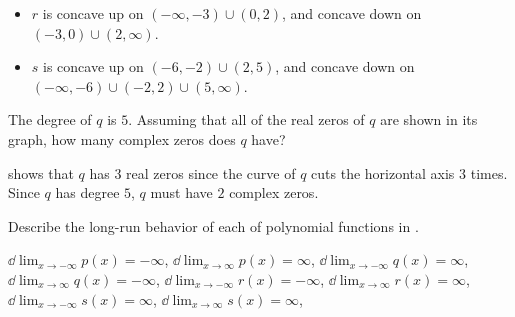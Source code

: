 \begin{exercises}
\begin{problem}
\begin{subproblem}
\begin{shortsolution}
\begin{itemize}
 				\item $r$ is concave up on $(-\infty,-3)\cup (0,2)$, and concave down on $(-3,0)\cup (2,\infty)$.
 				\item $s$ is concave up on $(-6,-2)\cup (2,5)$, and concave down on $(-\infty,-6)\cup (-2,2)\cup (5,\infty)$.
 			\end{itemize}
 		\end{shortsolution}
 	\end{subproblem}
 	\begin{subproblem}
 		The degree of $q$ is $5$. Assuming that all of the real zeros of $q$ are
 		shown in its graph, how many complex zeros does $q$ have?
 		\begin{shortsolution}
 			 shows that $q$ has $3$ real zeros
 			since the curve of $q$ cuts the horizontal axis $3$ times.
 			Since $q$ has degree $5$, $q$ must have $2$ complex zeros.
 		\end{shortsolution}
 	\end{subproblem}
 	\end{problem}

 	\begin{problem}
 	Describe the long-run behavior of each of polynomial functions in
 	.
 	\begin{shortsolution}
 		$\dd\lim_{x\rightarrow-\infty}p(x)=-\infty$,
 		$\dd\lim_{x\rightarrow\infty}p(x)=\infty$,
 		$\dd\lim_{x\rightarrow-\infty}q(x)=\infty$,
 		$\dd\lim_{x\rightarrow\infty}q(x)=-\infty$,
 		$\dd\lim_{x\rightarrow-\infty}r(x)=-\infty$,
 		$\dd\lim_{x\rightarrow\infty}r(x)=\infty$,
 		$\dd\lim_{x\rightarrow-\infty}s(x)=\infty$,
 		$\dd\lim_{x\rightarrow\infty}s(x)=\infty$,
 	\end{shortsolution}
 	\end{problem}


\end{exercises}
